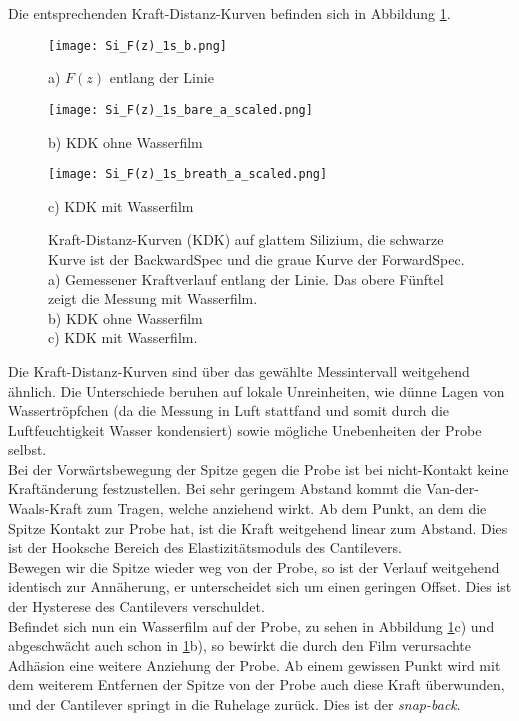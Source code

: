 Die entsprechenden Kraft-Distanz-Kurven befinden sich in Abbildung \ref{fig:Si_force-distance}.
\begin{figure}[h]
\centering
	\begin{minipage}{0.32\textwidth}
	\centering
		\texttt{[image: Si\_F(z)\_1s\_b.png]}
		\caption*{a) $F(z)$ entlang der Linie}
	\end{minipage}
	\hfill
	\begin{minipage}{0.28\textwidth}
	\centering
		\texttt{[image: Si\_F(z)\_1s\_bare\_a\_scaled.png]}
		\caption*{b) KDK ohne Wasserfilm}
	\end{minipage}
	\hfill
	\begin{minipage}{0.28\textwidth}
	\centering
		\texttt{[image: Si\_F(z)\_1s\_breath\_a\_scaled.png]}
		\caption*{c) KDK mit Wasserfilm}
	\end{minipage}
	\caption[Kraft-Distanz-Kurven auf glattem Silizium]{Kraft-Distanz-Kurven (KDK) auf glattem Silizium, die schwarze Kurve ist der BackwardSpec und die graue Kurve der ForwardSpec.\\ a) Gemessener Kraftverlauf entlang der Linie. Das obere Fünftel zeigt die Messung mit Wasserfilm.\\ b) KDK ohne Wasserfilm\\ c) KDK mit Wasserfilm.}
	\label{fig:Si_force-distance}
\end{figure}
Die Kraft-Distanz-Kurven sind über das gewählte Messintervall weitgehend ähnlich. Die Unterschiede beruhen auf lokale Unreinheiten, wie dünne Lagen von Wassertröpfchen (da die Messung in Luft stattfand und somit durch die Luftfeuchtigkeit Wasser kondensiert) sowie mögliche Unebenheiten der Probe selbst.\\ 
Bei der Vorwärtsbewegung der Spitze gegen die Probe ist bei nicht-Kontakt keine Kraftänderung festzustellen. Bei sehr geringem Abstand kommt die Van-der-Waals-Kraft zum Tragen, welche anziehend wirkt. Ab dem Punkt, an dem die Spitze Kontakt zur Probe hat, ist die Kraft weitgehend linear zum Abstand. Dies ist der Hooksche Bereich des Elastizitätsmoduls des Cantilevers.\\
Bewegen wir die Spitze wieder weg von der Probe, so ist der Verlauf weitgehend identisch zur Annäherung, er unterscheidet sich um einen geringen Offset. Dies ist der Hysterese des Cantilevers verschuldet.\\
Befindet sich nun ein Wasserfilm auf der Probe, zu sehen in Abbildung \ref{fig:Si_force-distance}c) und abgeschwächt auch schon in \ref{fig:Si_force-distance}b), so bewirkt die durch den Film verursachte Adhäsion eine weitere Anziehung der Probe. Ab einem gewissen Punkt wird mit dem weiterem Entfernen der Spitze von der Probe auch diese Kraft überwunden, und der Cantilever springt in die Ruhelage zurück. Dies ist der \emph{snap-back}.\\
